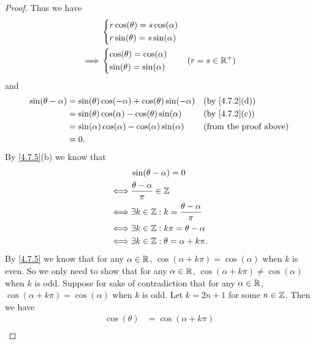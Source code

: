 \begin{proof}
  Thus we have
  \begin{align*}
             & \begin{dcases}
                 r \cos(\theta) = s \cos(\alpha) \\
                 r \sin(\theta) = s \sin(\alpha)
               \end{dcases}     \\
    \implies & \begin{dcases}
                 \cos(\theta) = \cos(\alpha) \\
                 \sin(\theta) = \sin(\alpha)
               \end{dcases}     & (r = s \in \mathbb{R}^+)
  \end{align*}
  and
  \begin{align*}
    \sin(\theta - \alpha) & = \sin(\theta) \cos(-\alpha) + \cos(\theta) \sin(-\alpha) &  & \text{(by \cref{4.7.2}(d))}   \\
                          & = \sin(\theta) \cos(\alpha) - \cos(\theta) \sin(\alpha)   &  & \text{(by \cref{4.7.2}(c))}   \\
                          & = \sin(\alpha) \cos(\alpha) - \cos(\alpha) \sin(\alpha)   &  & \text{(from the proof above)} \\
                          & = 0.
  \end{align*}
  By \cref{4.7.5}(b) we know that
  \begin{align*}
         & \sin(\theta - \alpha) = 0                           \\
    \iff & \dfrac{\theta - \alpha}{\pi} \in \mathbb{Z}                 \\
    \iff & \exists k \in \mathbb{Z} : k = \dfrac{\theta - \alpha}{\pi} \\
    \iff & \exists k \in \mathbb{Z} : k \pi = \theta - \alpha          \\
    \iff & \exists k \in \mathbb{Z} : \theta = \alpha + k \pi.
  \end{align*}
  By \cref{4.7.5} we know that for any \(\alpha \in \mathbb{R}\), \(\cos(\alpha + k \pi) = \cos(\alpha)\) when \(k\) is even.
  So we only need to show that for any \(\alpha \in \mathbb{R}\), \(\cos(\alpha + k \pi) \neq \cos(\alpha)\) when \(k\) is odd.
  Suppose for sake of contradiction that for any \(\alpha \in \mathbb{R}\), \(\cos(\alpha + k \pi) = \cos(\alpha)\) when \(k\) is odd.
  Let \(k = 2n + 1\) for some \(n \in \mathbb{Z}\).
  Then we have
  \begin{align*}
    \cos(\theta) & = \cos(\alpha + k \pi)                                                   \\

\end{align*}
\end{proof}
